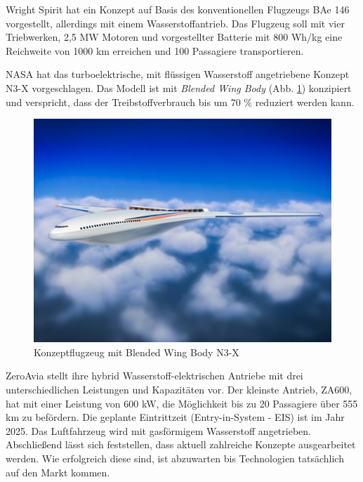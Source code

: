 Wright Spirit \cite{wright_electric_website} hat ein Konzept auf Basis 
des konventionellen Flugzeugs BAe 146 vorgestellt, allerdings mit einem Wasserstoffantrieb.
Das Flugzeug soll mit vier Triebwerken, 2,5 MW Motoren und vorgestellter Batterie 
mit 800 Wh/kg eine Reichweite von 1000 km erreichen und 100 Passagiere transportieren.

NASA hat das turboelektrische, mit flüssigen Wasserstoff angetriebene 
Konzept N3-X \cite{NASA_N3X_2025} vorgeschlagen.
Das Modell ist mit \textit{Blended Wing Body} (Abb. \ref{NASA_konfig}) konzipiert und verspricht, 
dass der Treibstoffverbrauch bis um 70 \% reduziert werden kann.
\begin{figure}[h]
	\centering
	\includegraphics[width=0.6\linewidth]{Bilder/NASA.jpg}
	\caption[Konzeptflugzeug mit Blended Wing Body N3-X]{Konzeptflugzeug mit Blended Wing Body N3-X \cite{NASA_N3X_2025} }
	\label{NASA_konfig}
\end{figure}

ZeroAvia stellt ihre hybrid Wasserstoff-elektrischen Antriebe 
mit drei unterschiedlichen Leistungen und Kapazitäten vor. 
Der kleinste Antrieb, ZA600, hat mit einer Leistung von 600 kW,
die Möglichkeit bis zu 20 Passagiere über 555 km zu befördern. 
Die geplante Eintrittzeit (Entry-in-System - EIS) ist im Jahr 2025. 
Das Luftfahrzeug wird mit gasförmigem Wasserstoff angetrieben.
%
Abschließend lässt sich feststellen, dass aktuell zahlreiche Konzepte ausgearbeitet werden. 
Wie erfolgreich diese sind, ist abzuwarten bis Technologien tatsächlich auf den Markt kommen.
